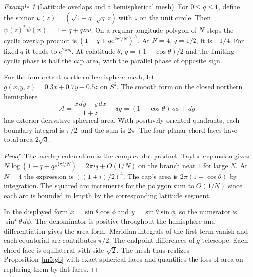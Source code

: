 \documentclass[11pt,reqno]{amsart}
\theoremstyle{definition}
\theoremstyle{remark}
\newtheorem{example}[theorem]{Example}
\numberwithin{equation}{section}
\begin{document}
\begin{example}[Latitude overlaps and a hemispherical mesh]\label{m8:latitude}
For $0\le q\le1$, define the spinor
$\psi(z)=(\sqrt{1-q},\sqrt q\,z)$ with $z$ on the unit circle.
Then $\psi(z)^*\psi(w)=1-q+q\bar z w$. On a regular longitude
polygon of $N$ steps the cyclic overlap product is
$(1-q+q e^{2\pi i/N})^N$. At $N=4$, $q=1/2$, it is $-1/4$.
For fixed $q$ it tends to $e^{2\pi i q}$. At colatitude
$\theta$, $q=(1-\cos\theta)/2$ and the limiting cyclic phase is
half the cap area, with the parallel phase of opposite sign.

For the four-octant northern hemisphere mesh, let
$g(x,y,z)=0.3x+0.7y-0.5z$ on $S^2$. The smooth form on the
closed northern hemisphere
\[
 \mathcal A=\frac{x\,dy-y\,dx}{1+z}+dg
           =(1-\cos\theta)\,d\phi+dg
\]
has exterior derivative spherical area. With positively oriented
quadrants, each boundary integral is $\pi/2$, and the sum is
$2\pi$. The four planar chord faces have total area $2\sqrt3$.
\end{example}
\begin{proof}
The overlap calculation is the complex dot product. Taylor
expansion gives $N\log(1-q+qe^{2\pi i/N})=2\pi i q+O(1/N)$
on the branch near $1$ for large $N$. At $N=4$ the expression
is $((1+i)/2)^4$. The cap's area is $2\pi(1-\cos\theta)$
by integration. The squared arc increments for the polygon
sum to $O(1/N)$ since each arc is bounded in length by the
corresponding latitude segment.

In the displayed form $x=\sin\theta\cos\phi$ and
$y=\sin\theta\sin\phi$, so the numerator is $\sin^2\theta\,d\phi$.
The denominator is positive throughout the hemisphere and
differentiation gives the area form. Meridian integrals of the
first term vanish and each equatorial arc contributes $\pi/2$.
The endpoint differences of $g$ telescope. Each chord face is
equilateral with side $\sqrt2$. The mesh thus realizes
Proposition~\ref{m5:gb} with exact spherical faces and quantifies
the loss of area on replacing them by flat faces.
\end{proof}
\end{document}
